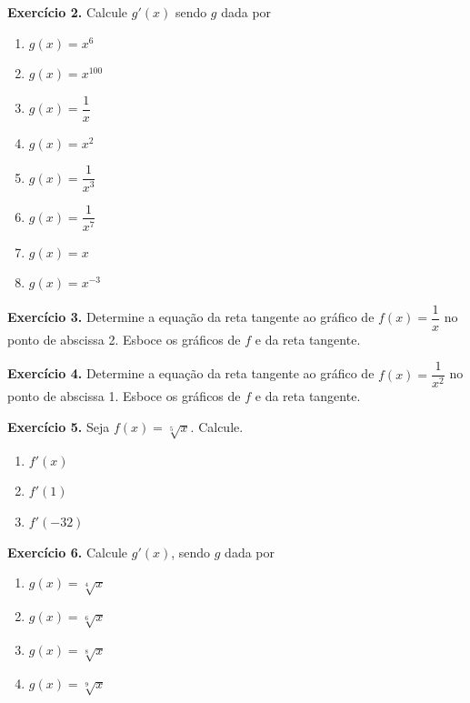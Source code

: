 \documentclass[12pt,a4paper]{article}
\begin{document}
\vspace{0.5cm}
\noindent\textbf{Exercício 2.} Calcule $g'(x)$ sendo $g$ dada por
\begin{enumerate}
    \renewcommand{\theenumi}{\alph{enumi}}
    \renewcommand{\labelenumi}{\theenumi)}
    \item $g(x) = x^6$
    \item $g(x) = x^{100}$
    \item $g(x) = \dfrac{1}{x}$
    \item $g(x) = x^2$
    \item $g(x) = \dfrac{1}{x^3}$
    \item $g(x) = \dfrac{1}{x^7}$
    \item $g(x) = x$
    \item $g(x) = x^{-3}$
\end{enumerate}

\vspace{0.5cm}
\noindent\textbf{Exercício 3.}
Determine a equação da reta tangente ao gráfico de $f(x) = \dfrac{1}{x}$ no ponto de abscissa 2. Esboce os gráficos de $f$ e da reta tangente.

\vspace{0.5cm}
\noindent\textbf{Exercício 4.}
Determine a equação da reta tangente ao gráfico de $f(x) = \dfrac{1}{x^2}$ no ponto de abscissa 1. Esboce os gráficos de $f$ e da reta tangente.

\vspace{0.5cm}
\noindent\textbf{Exercício 5.} Seja $f(x) = \sqrt[5]{x}$. Calcule.
\begin{enumerate}
    \renewcommand{\theenumi}{\alph{enumi}}
    \renewcommand{\labelenumi}{\theenumi)}
    \item $f'(x)$
    \item $f'(1)$
    \item $f'(-32)$
\end{enumerate}

\vspace{0.5cm}
\noindent\textbf{Exercício 6.} Calcule $g'(x)$, sendo $g$ dada por
\begin{enumerate}
    \renewcommand{\theenumi}{\alph{enumi}}
    \renewcommand{\labelenumi}{\theenumi)}
    \item $g(x) = \sqrt[4]{x}$
    \item $g(x) = \sqrt[6]{x}$
    \item $g(x) = \sqrt[8]{x}$
    \item $g(x) = \sqrt[9]{x}$
\end{enumerate}
\end{document}
